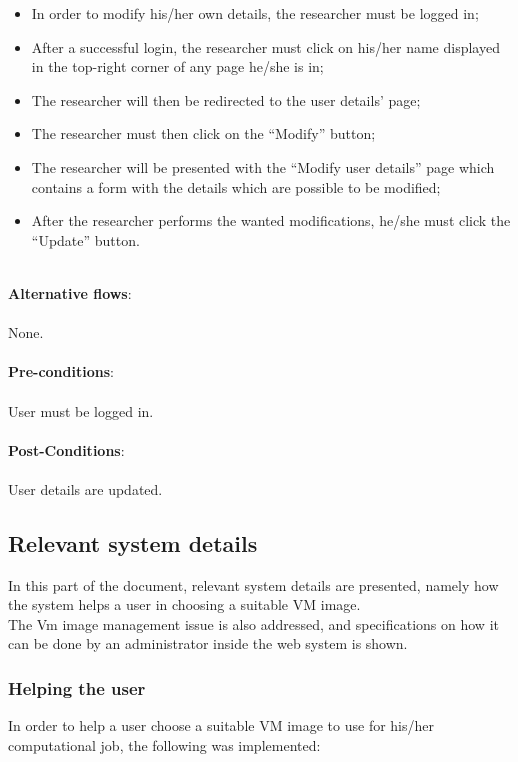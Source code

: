 \begin{itemize}
\item In order to modify his/her own details, the researcher must be logged in;
\item After a successful login, the researcher must click on his/her name displayed in the top-right corner of any page he/she is in;
\item The researcher will then be redirected to the user details' page;
\item The researcher must then click on the ``Modify'' button;
\item The researcher will be presented with the ``Modify user details'' page which contains a form with the details which are possible to be modified;
\item After the researcher performs the wanted modifications, he/she must click the ``Update'' button.
\end{itemize}

\ \\
\textbf{Alternative flows}:\\
\ \\
None.\\
\ \\
\textbf{Pre-conditions}:\\
\ \\
User must be logged in.\\
\ \\
\textbf{Post-Conditions}:\\
\ \\
User details are updated.

\subsection{Relevant system details}%

In this part of the document, relevant system details are presented, namely how the system helps a user in choosing a suitable VM image.\ \\
The Vm image management issue is also addressed, and specifications on how it can be done by an administrator inside the web system is shown.

\subsubsection{Helping the user}


In order to help a user choose a suitable VM image to use for his/her computational job, the following was implemented:


